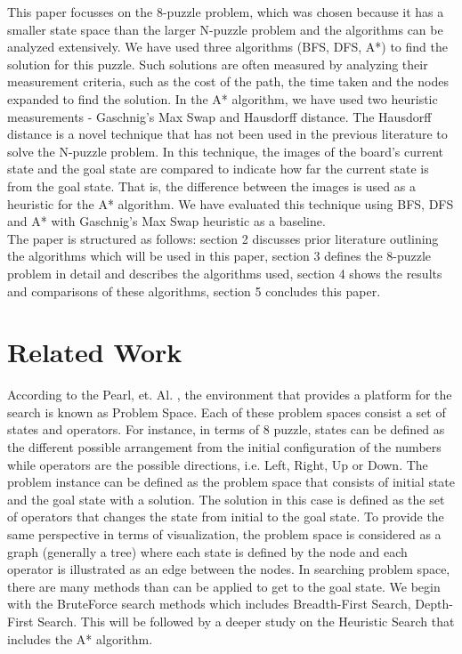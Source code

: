 \documentclass{svproc}
\begin{document}
\noindent  This paper focusses on the 8-puzzle problem, which was chosen because it has a smaller state space than the larger N-puzzle problem and the algorithms can be analyzed extensively. We have used three algorithms (BFS, DFS, A*) to find the solution for this puzzle. Such solutions are often measured by analyzing their measurement criteria, such as the cost of the path, the time taken and the nodes expanded to find the solution. In the A* algorithm, we have used two heuristic measurements - Gaschnig’s Max Swap and Hausdorff distance. The Hausdorff distance is a novel technique that has not been used in the previous literature to solve the N-puzzle problem. In this technique, the images of the board's current state and the goal state are compared to indicate how far the current state is from the goal state. That is, the difference between the images is used as a heuristic for the A* algorithm. We have evaluated this technique using BFS, DFS and A* with Gaschnig’s Max Swap heuristic as a baseline.  \\

\noindent The paper is structured as follows: section 2 discusses prior literature outlining the algorithms which will be used in this paper,  section 3 defines the 8-puzzle problem in detail and describes the algorithms used, section 4 shows the results and comparisons of these algorithms, section 5 concludes this paper.

\section{Related Work}
\noindent According to the Pearl, et. Al. {\cite{pea}}, the environment that provides a platform for the search is known as Problem Space. Each of these problem spaces consist a set of states and operators. For instance, in terms of 8 puzzle, states can be defined as the different possible arrangement from the initial configuration of the numbers while operators are the possible directions, i.e. Left, Right, Up or Down. The problem instance can be defined as the problem space that consists of initial state and the goal state with a solution. The solution in this case is defined as the set of operators that changes the state from initial to the goal state. To provide the same perspective in terms of visualization, the problem space is considered as a graph (generally a tree) where each state is defined by the node and each operator is illustrated as an edge between the nodes. In searching problem space, there are many methods than can be applied to get to the goal state. We begin with the BruteForce search methods which includes Breadth-First Search, Depth-First Search. This will be followed by a deeper study on the Heuristic Search that includes the A* algorithm.\\
\end{document}
